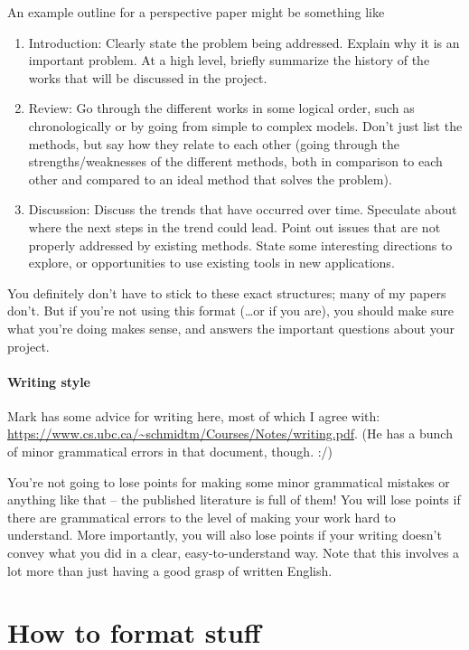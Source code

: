 \documentclass{article}
\begin{document}
An example outline for a perspective paper might be something like
\begin{enumerate}
\item Introduction: Clearly state the problem being addressed. Explain why it is an important problem. At a high level, briefly summarize the history of the works that will be discussed in the project.
\item Review: Go through the different works in some logical order, such as chronologically or by going from simple to complex models. Don't just list the methods, but say how they relate to each other (going through the strengths/weaknesses of the different methods, both in comparison to each other and compared to an ideal method that solves the problem).
\item Discussion: Discuss the trends that have occurred over time. Speculate about where the next steps in the trend could lead. Point out issues that are not properly addressed by existing methods. State some interesting directions to explore, or opportunities to use existing tools in new applications.
\end{enumerate}

You definitely don't have to stick to these exact structures; many of my papers don't.
But if you're not using this format (\dots or if you are), you should make sure what you're doing makes sense,
and answers the important questions about your project.

\paragraph{Writing style}
Mark has some advice for writing here, most of which I agree with:
\url{https://www.cs.ubc.ca/~schmidtm/Courses/Notes/writing.pdf}.
(He has a bunch of minor grammatical errors in that document, though. :/)

You're not going to lose points for making some minor grammatical mistakes or anything like that
-- the published literature is full of them!
You will lose points if there are grammatical errors to the level of making your work hard to understand.
More importantly, you will also lose points if your writing doesn't convey what you did
in a clear, easy-to-understand way.
Note that this involves a lot more than just having a good grasp of written English.


\section{How to format stuff}
\end{document}
